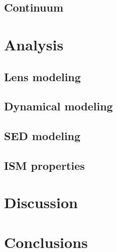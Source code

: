 \documentclass[]{emulateapj}
\begin{document}
  \subsection{\cco}
  \subsection{Continuum}
  
  \section{Analysis}
  \subsection{Lens modeling}
  \subsection{\bco Dynamical modeling}
  \subsection{SED modeling}
  \subsection{ISM properties}
  
  \section{Discussion}
  
  
  \section{Conclusions}
  


\acknowledgments




\end{document}
